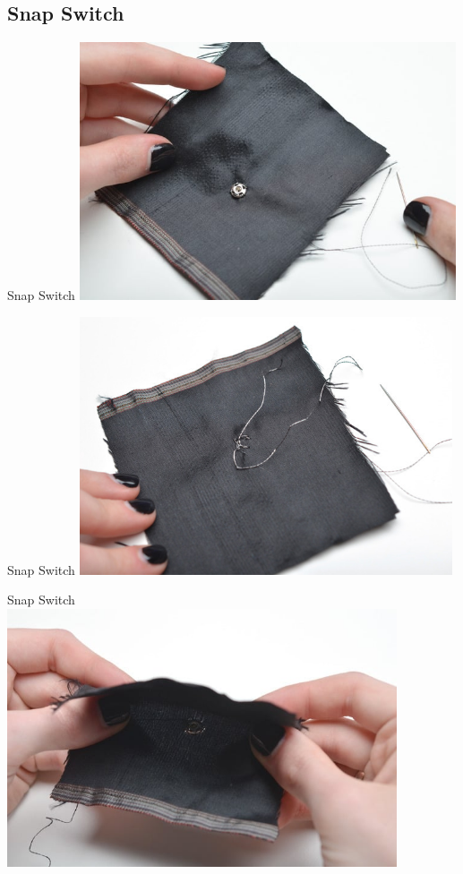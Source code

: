 \documentclass{beamer}
\begin{document}
\subsection{Snap Switch}
\begin{frame}[fragile]{Snap Switch}
\includegraphics[height=3in]{flora-angler-embroidery-17.jpg}
\end{frame}
\begin{frame}[fragile]{Snap Switch}
\includegraphics[height=3in]{flora-angler-embroidery-18.jpg}
\end{frame}
\begin{frame}[fragile]{Snap Switch}
\includegraphics[height=3in]{flora-angler-embroidery-19.jpg}
\end{frame}
\end{document}
